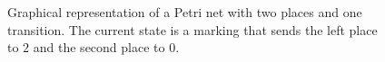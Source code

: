 \begin{figure}
	\centering
	\caption{Graphical representation of a Petri net with two places and one transition. The current state is a marking that sends the left place to $2$ and the second place to $0$.}
	\label{net:sample}
\end{figure}